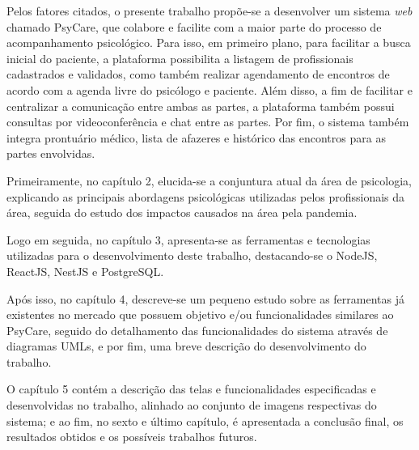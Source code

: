 Pelos fatores citados, o presente trabalho propõe-se a desenvolver um sistema \textit{web} chamado PsyCare, que colabore e facilite com a maior parte do processo de acompanhamento psicológico. Para isso, em primeiro plano, para facilitar a busca inicial do paciente, a plataforma possibilita a listagem de profissionais cadastrados e validados, como também realizar agendamento de encontros de acordo com a agenda livre do psicólogo e paciente. Além disso, a fim de facilitar e centralizar a comunicação entre ambas as partes, a plataforma também possui consultas por videoconferência e chat entre as partes. Por fim, o sistema também integra prontuário médico, lista de afazeres e histórico das encontros para as partes envolvidas.

Primeiramente, no capítulo 2, elucida-se a conjuntura atual da área de psicologia, explicando as principais abordagens psicológicas utilizadas pelos profissionais da área, seguida do estudo dos impactos causados na área pela pandemia.

Logo em seguida, no capítulo 3, apresenta-se as ferramentas e tecnologias utilizadas para o desenvolvimento deste trabalho, destacando-se o NodeJS, ReactJS, NestJS e PostgreSQL.

Após isso, no capítulo 4, descreve-se um pequeno estudo sobre as ferramentas já existentes no mercado que possuem objetivo e/ou funcionalidades similares ao PsyCare, seguido do detalhamento das funcionalidades do sistema através de diagramas UMLs, e por fim, uma breve descrição do desenvolvimento do trabalho.

O capítulo 5 contém a descrição das telas e funcionalidades especificadas e desenvolvidas no trabalho, alinhado ao conjunto de imagens respectivas do sistema; e ao fim, no sexto e último capítulo, é apresentada a conclusão final, os resultados obtidos e os possíveis trabalhos futuros.
